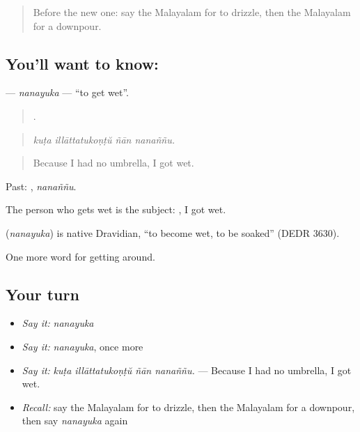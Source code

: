 \label{lesson:ML-C508-nanayuka}



\begin{quote}
Before the new one: say the Malayalam for to drizzle, then the Malayalam for a downpour.
\end{quote}

\subsection*{You'll want to know: }
\textbf{} — \emph{nanayuka} — \textquotedblleft{}to get wet\textquotedblright{}.

\begin{quote}
   .
\end{quote}

\begin{quote}
\emph{kuṭa illāttatukoṇṭŭ ñān nanaññu.}
\end{quote}

\begin{quote}
Because I had no umbrella, I got wet.
\end{quote}

Past: , \emph{nanaññu}.

The person who gets wet is the subject:  , I got wet.

\begin{cousinweb}
\textbf{} (\emph{nanayuka}) is native Dravidian, \textquotedblleft{}to become wet, to be soaked\textquotedblright{} (DEDR 3630).
\end{cousinweb}

\begin{grammarlens}[title={What you've built}]
One more word for getting around.
\end{grammarlens}

\subsection*{Your turn}
\begin{itemize}
\raggedright
  \item \emph{Say it:} \emph{nanayuka}
  \item \emph{Say it:} \emph{nanayuka}, once more
  \item \emph{Say it:} \emph{kuṭa illāttatukoṇṭŭ ñān nanaññu.} — Because I had no umbrella, I got wet.
  \item \emph{Recall:} say the Malayalam for to drizzle, then the Malayalam for a downpour, then say \emph{nanayuka} again
\end{itemize}

